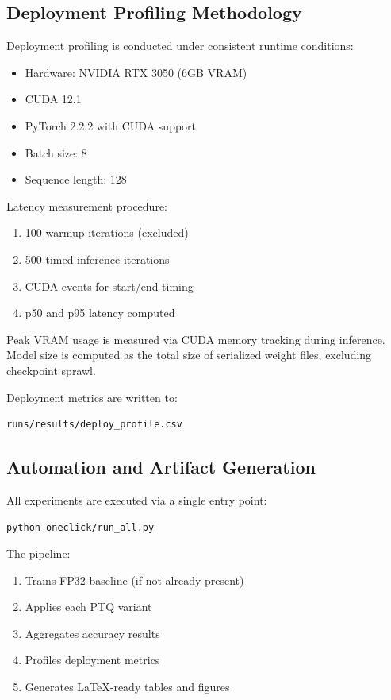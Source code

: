\documentclass[conference]{IEEEtran}
\begin{document}
\subsection{Deployment Profiling Methodology}

Deployment profiling is conducted under consistent runtime conditions:

\begin{itemize}
\item Hardware: NVIDIA RTX 3050 (6GB VRAM)
\item CUDA 12.1
\item PyTorch 2.2.2 with CUDA support
\item Batch size: 8
\item Sequence length: 128
\end{itemize}

Latency measurement procedure:

\begin{enumerate}
\item 100 warmup iterations (excluded)
\item 500 timed inference iterations
\item CUDA events for start/end timing
\item p50 and p95 latency computed
\end{enumerate}

Peak VRAM usage is measured via CUDA memory tracking during inference. Model size is computed as the total size of serialized weight files, excluding checkpoint sprawl.

Deployment metrics are written to:

\begin{verbatim}
runs/results/deploy_profile.csv
\end{verbatim}

\subsection{Automation and Artifact Generation}

All experiments are executed via a single entry point:

\begin{verbatim}
python oneclick/run_all.py
\end{verbatim}

The pipeline:

\begin{enumerate}
\item Trains FP32 baseline (if not already present)
\item Applies each PTQ variant
\item Aggregates accuracy results
\item Profiles deployment metrics
\item Generates LaTeX-ready tables and figures
\end{enumerate}
\end{document}
